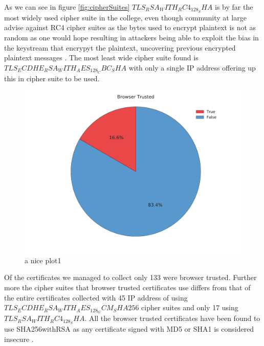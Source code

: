 \documentclass[a4wide,leqno,12pt]{report}
\begin{document}
As we can see in figure \ref{fig:cipherSuites} $TLS_RSA_WITH_RC4_128_SHA$ is by far the most widely used cipher suite in the college, even though community at large advise against RC4 cipher suites as the bytes used to encrypt plaintext is not as random as one would hope resulting in attackers being able to exploit the bias in the keystream that encrypyt the plaintext, uncovering previous encrypted plaintext messages \cite{popov2015prohibiting}. The most least wide cipher suite found is  $TLS_ECDHE_RSA_WITH_AES_128_CBC_SHA$ with only a single IP address offering up this in cipher suite to be used.

\begin{figure}[h!]
\includegraphics[scale=.5]{pdf_images/BrowserTrusted}
\caption{a nice plot1}
\label{fig:browserTrusted}
\end{figure}
Of the certificates we managed to collect only 133 were browser trusted. Further more the cipher suites that browser trusted certificates use differs from that of the entire certificates collected with 45 IP address of using  $TLS_ECDHE_RSA_WITH_AES_128_GCM_SHA256$ cipher suites and only 17 using $TLS_RSA_WITH_RC4_128_SHA$. All the browser trusted certificates have been found to use SHA256withRSA as any certificate signed with MD5 or SHA1 is considered insecure \cite{ssllabs}.
 
\end{document}
